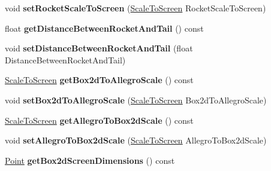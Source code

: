 \begin{DoxyCompactItemize}
\item 
void {\bfseries set\+Rocket\+Scale\+To\+Screen} (\hyperlink{classScaleToScreen}{Scale\+To\+Screen} Rocket\+Scale\+To\+Screen)\hypertarget{classGameConfiguration_a6511ac6ed0dcf74f0bca75addc74345a}{}\label{classGameConfiguration_a6511ac6ed0dcf74f0bca75addc74345a}

\item 
float {\bfseries get\+Distance\+Between\+Rocket\+And\+Tail} () const \hypertarget{classGameConfiguration_af72c0d2e65c7b97cf845a9b552f06fda}{}\label{classGameConfiguration_af72c0d2e65c7b97cf845a9b552f06fda}

\item 
void {\bfseries set\+Distance\+Between\+Rocket\+And\+Tail} (float Distance\+Between\+Rocket\+And\+Tail)\hypertarget{classGameConfiguration_a6ef296f93ebfc95a2d2714090dad637c}{}\label{classGameConfiguration_a6ef296f93ebfc95a2d2714090dad637c}

\item 
\hyperlink{classScaleToScreen}{Scale\+To\+Screen} {\bfseries get\+Box2d\+To\+Allegro\+Scale} () const \hypertarget{classGameConfiguration_abacc05464dd8bca8158ea98b827cf33d}{}\label{classGameConfiguration_abacc05464dd8bca8158ea98b827cf33d}

\item 
void {\bfseries set\+Box2d\+To\+Allegro\+Scale} (\hyperlink{classScaleToScreen}{Scale\+To\+Screen} Box2d\+To\+Allegro\+Scale)\hypertarget{classGameConfiguration_a6a035965067079a19243884b15d69da6}{}\label{classGameConfiguration_a6a035965067079a19243884b15d69da6}

\item 
\hyperlink{classScaleToScreen}{Scale\+To\+Screen} {\bfseries get\+Allegro\+To\+Box2d\+Scale} () const \hypertarget{classGameConfiguration_a02bd71b4bdbdf12375d8166ff51e8ffa}{}\label{classGameConfiguration_a02bd71b4bdbdf12375d8166ff51e8ffa}

\item 
void {\bfseries set\+Allegro\+To\+Box2d\+Scale} (\hyperlink{classScaleToScreen}{Scale\+To\+Screen} Allegro\+To\+Box2d\+Scale)\hypertarget{classGameConfiguration_a477eb4c18409b56643d36c08114a828c}{}\label{classGameConfiguration_a477eb4c18409b56643d36c08114a828c}

\item 
\hyperlink{classPoint}{Point} {\bfseries get\+Box2d\+Screen\+Dimensions} () const \hypertarget{classGameConfiguration_af0e7f4289f2e99cae96ca3b301af560b}{}\label{classGameConfiguration_af0e7f4289f2e99cae96ca3b301af560b}


\end{DoxyCompactItemize}
